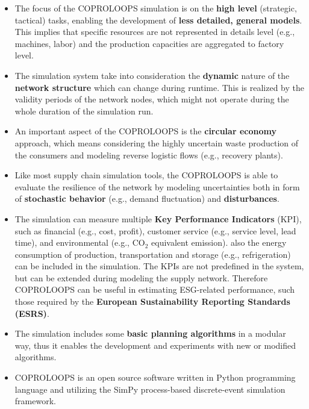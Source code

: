 \documentclass{article}
\newcommand{\NAME}{COPROLOOPS }
\begin{document}
\begin{itemize}
\item The focus of the \NAME simulation is on the \textbf{high level} (strategic, tactical) tasks, enabling the development of \textbf{less detailed, general models}. This implies that specific resources are not represented in details level (e.g., machines, labor) and the production capacities are aggregated to factory level.

\item The simulation system take into consideration the \textbf{dynamic} nature of the \textbf{network structure} which can change during runtime. This is realized by the validity periods of the network nodes, which might not operate during the whole duration of the simulation run.

\item An important aspect of the \NAME is the \textbf{circular economy} approach, which means considering the highly uncertain waste production of the consumers and modeling reverse logistic flows (e.g., recovery plants).

\item Like most supply chain simulation tools, the \NAME is able to evaluate the resilience of the network by modeling uncertainties both in form of \textbf{stochastic behavior} (e.g., demand fluctuation) and \textbf{disturbances}.

\item The simulation can measure multiple \textbf{Key Performance Indicators} (KPI), such as financial (e.g., cost, profit), customer service (e.g., service level, lead time), and environmental (e.g., CO$_2$ equivalent emission). also the energy consumption of production, transportation and storage (e.g., refrigeration) can be included in the simulation. The KPIs are not predefined in the system, but can be extended during modeling the supply network. Therefore \NAME can be useful in estimating ESG-related performance, such those required by the \textbf{European Sustainability Reporting Standards (ESRS)}.

\item The simulation includes some \textbf{basic planning algorithms} in a modular way, thus it enables the development and experiments with new or modified algorithms.

\item \NAME is an open source software written in Python programming language and utilizing the SimPy process-based discrete-event simulation framework.
\end{itemize}
\end{document}
